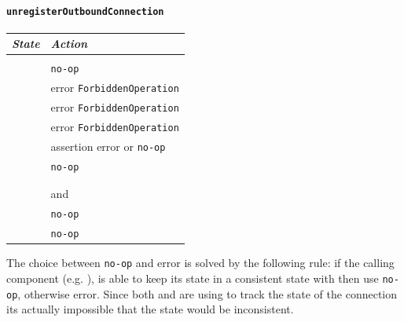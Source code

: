 \paragraph{\texttt{unregisterOutboundConnection}}
\begin{center}
  \begin{tabular}[h]{ll}
    \textit{State}           & \textit{Action} \\\hline\\[2pt]
    \InitialState{}          & \texttt{no-op} \\[8pt]
    \ReservedOutboundState{} & error \texttt{ForbiddenOperation} \\[8pt]
    \UnnegotiatedStateOut{}  & error \texttt{ForbiddenOperation} \\[8pt]
    \UnnegotiatedStateIn{}   & error \texttt{ForbiddenOperation} \\[8pt]
    \InboundIdleStateUni{}   & assertion error or \texttt{no-op} \\[8pt]
    \InboundIdleStateDup{}   & \texttt{no-op} \\[8pt]
    \OutboundStateUni{}      & \DemotedToColdUniLoc{} \\[8pt]
    \OutboundStateDup{}      & \DemotedToColdDupLoc{} \\[8pt]
    \DuplexState{}           & \Prune{} and \DemotedToColdDupLoc{} \\[8pt]
    \TerminatingState{}      & \texttt{no-op} \\[8pt]
    \TerminatedState{}       & \texttt{no-op} \\[8pt]
  \end{tabular}
\end{center}
The choice between \texttt{no-op} and error is solved by the following rule: if
the calling component (e.g. \ptopgov{}), is able to keep its state in
a consistent state with \connmngr{} then use \texttt{no-op}, otherwise
error.  Since both \inbgov{} and \ptopgov{} are using \mux{} to track the state
of the connection its actually impossible that the state would be inconsistent.

